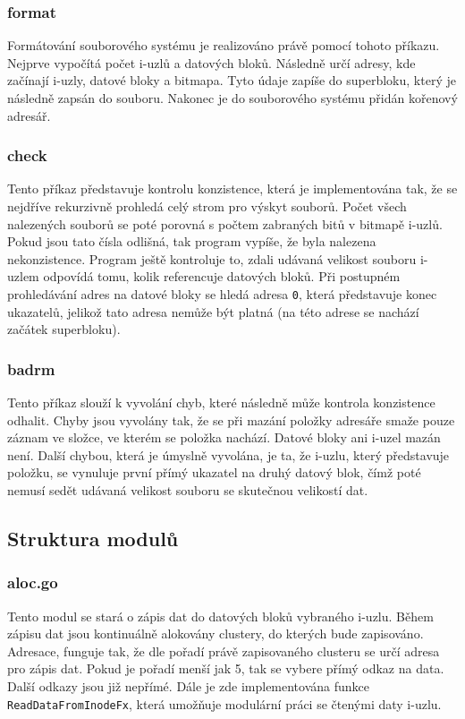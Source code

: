 \documentclass[12pt, a4paper]{article}
\begin{document}
		\subsubsection{format}
	Formátování souborového systému je realizováno právě pomocí tohoto příkazu. Nejprve vypočítá počet i-uzlů a datových bloků. Následně určí adresy, kde začínají i-uzly, datové bloky a bitmapa. Tyto údaje zapíše do superbloku, který je následně zapsán do souboru. Nakonec je do souborového systému přidán kořenový adresář.
	
		\subsubsection{check}
	Tento příkaz představuje kontrolu konzistence, která je implementována tak, že se nejdříve rekurzivně prohledá celý strom pro výskyt souborů. Počet všech nalezených souborů se poté porovná s počtem zabraných bitů v bitmapě i-uzlů. Pokud jsou tato čísla odlišná, tak program vypíše, že byla nalezena nekonzistence. Program ještě kontroluje to, zdali udávaná velikost souboru i-uzlem odpovídá tomu, kolik referencuje datových bloků. Při postupném prohledávání adres na datové bloky se hledá adresa  \texttt{0}, která představuje konec ukazatelů, jelikož tato adresa nemůže být platná (na této adrese se nachází začátek superbloku).
		
		\subsubsection{badrm}
	Tento příkaz slouží k vyvolání chyb, které následně může kontrola konzistence odhalit. Chyby jsou vyvolány tak, že se při mazání položky adresáře smaže pouze záznam ve složce, ve kterém se položka nachází. Datové bloky ani i-uzel mazán není. Další chybou, která je úmyslně vyvolána, je ta, že i-uzlu, který představuje položku, se vynuluje první přímý ukazatel na druhý datový blok, čímž poté nemusí sedět udávaná velikost souboru se skutečnou velikostí dat.
		
		
    \subsection{Struktura modulů}
			\subsubsection{aloc.go}
			Tento modul se stará o zápis dat do datových bloků vybraného i-uzlu. Během zápisu dat jsou kontinuálně alokovány clustery, do kterých bude zapisováno. Adresace, funguje tak, že dle pořadí právě zapisovaného clusteru se určí adresa pro zápis dat. Pokud je pořadí menší jak 5, tak se vybere přímý odkaz na data. Další odkazy jsou již nepřímé. Dále je zde implementována funkce \texttt{ReadDataFromInodeFx}, která umožňuje modulární práci se čtenými daty i-uzlu.
\end{document}

